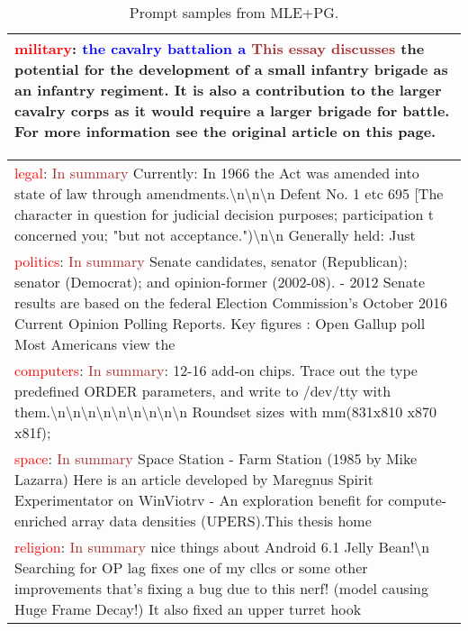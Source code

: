 \begin{table*}
\begin{tabular}{p{}}
\textcolor{red}{military}: \textcolor{blue}{the cavalry battalion a} \textcolor{brown}{This essay discusses} the potential for the development of a small infantry brigade as an infantry regiment. It is also a contribution to the larger cavalry corps as it would require a larger brigade for battle. For more information see the original article on this page. \\
\bottomrule
\end{tabular}
\caption{Prompt samples from MLE+PG.}
\label{table:prompt-examples-pg}
\end{table*}




\begin{table*}
\centering
\small
\begin{tabular}{p{}}
\toprule
\textcolor{red}{legal}: \textcolor{brown}{In summary} Currently: In 1966 the Act was amended into state of law through amendments.\textbackslash n\textbackslash n\textbackslash n Defent No. 1 etc 695 [The character in question for judicial decision purposes; participation t concerned you; "but not acceptance.")\textbackslash n\textbackslash n Generally held: Just \\
\textcolor{red}{politics}: \textcolor{brown}{In summary} Senate candidates, senator (Republican); senator (Democrat); and opinion-former (2002-08). - 2012 Senate results are based on the federal Election Commission's October 2016 Current Opinion Polling Reports. Key figures : Open Gallup poll Most Americans view the \\
\textcolor{red}{computers}: \textcolor{brown}{In summary}: 12-16 add-on chips. Trace out the type predefined ORDER parameters, and write to /dev/tty with them.\textbackslash n\textbackslash n\textbackslash n\textbackslash n\textbackslash n\textbackslash n\textbackslash n\textbackslash n\textbackslash n Roundset sizes with mm(831x810 x870 x81f); \\
\textcolor{red}{space}: \textcolor{brown}{In summary} Space Station - Farm Station (1985 by Mike Lazarra) Here is an article developed by Maregnus Spirit Experimentator on WinViotrv - An exploration benefit for compute-enriched array data densities (UPERS).This thesis home \\
\textcolor{red}{religion}: \textcolor{brown}{In summary} nice things about Android 6.1 Jelly Bean!\textbackslash n Searching for OP lag fixes one of my cllcs or some other improvements that's fixing a bug due to this nerf! (model causing Huge Frame Decay!) It also fixed an upper turret hook \\

\end{tabular}
\end{table*}

